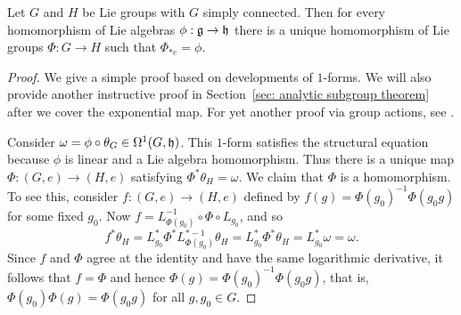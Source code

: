 \begin{thm}\label{thm second principle}
    Let $G$ and $H$ be Lie groups with $G$ simply connected. Then for every homomorphism of Lie algebras $\phi:\mathfrak{g}\to\mathfrak{h}$ there is a unique homomorphism of Lie groups $\Phi:G\to H$ such that $\Phi_{\ast e}=\phi$.
\end{thm}
\begin{proof}
    We give a simple proof based on developments of $1$-forms. We will also provide another instructive proof in Section~\ref{sec: analytic subgroup theorem} after we cover the exponential map. For yet another proof via group actions, see \cite[Thm.~20.19]{Lee}.

    Consider $\omega=\phi\circ \theta_G\in \Omega^1(G,\mathfrak{h})$. This $1$-form satisfies the structural equation because $\phi$ is linear and a Lie algebra homomorphism. Thus there is a unique map $\Phi:(G,e)\to (H,e)$ satisfying $\Phi^\ast \theta_H=\omega$. We claim that $\Phi$ is a homomorphism. To see this, consider $f:(G,e)\to (H,e)$ defined by $f(g)=\Phi(g_0)^{-1}\Phi(g_0g)$ for some fixed $g_0$. Now $f=L_{\Phi(g_0)}^{-1}\circ\Phi\circ L_{g_0}$, and so
    \[f^\ast\theta_H=L_{g_0}^\ast \Phi^\ast L_{\Phi(g_0)}^{\ast-1}\theta_H=L_{g_0}^\ast \Phi^\ast\theta_H=L_{g_0}^\ast \omega=\omega.\]
    Since $f$ and $\Phi$ agree at the identity and have the same logarithmic derivative, it follows that $f=\Phi$ and hence $\Phi(g)=\Phi(g_0)^{-1}\Phi(g_0g)$, that is, $\Phi(g_0)\Phi(g)=\Phi(g_0g)$ for all $g,g_0\in G$.


\end{proof}

